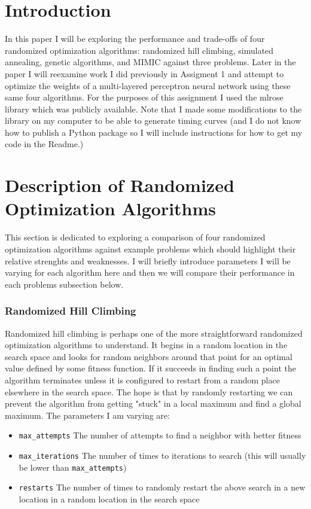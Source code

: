 \documentclass[11pt]{article}
\begin{document}
    \thispagestyle{firstpage}


    \section{Introduction}
    In this paper I will be exploring the performance and trade-offs of four randomized optimization algorithms: randomized hill climbing,
    simulated annealing, genetic algorithms, and MIMIC against three problems.
    Later in the paper I will reexamine work I did previously in Assigment 1 and attempt to optimize the weights of a multi-layered perceptron neural network
    using these same four algorithms.
    For the purposes of this assignment I used the mlrose library\cite{Hayes19} which was publicly available.
    Note that I made some modifications to the library on my computer to be able to generate timing curves (and I do not
    know how to publish a Python package so I will include instructions for how to get my code in the Readme.)


    \section{Description of Randomized Optimization Algorithms}\label{sec:description-of-randomized-optimization-algorithms}
    This section is dedicated to exploring a comparison of four randomized optimization algorithms against example problems
    which should highlight their relative strenghts and weaknesses.
    I will briefly introduce parameters I will be varying for each algorithm here and then we will compare their performance
    in each problems subsection below.
    \subsubsection*{Randomized Hill Climbing}
    Randomized hill climbing is perhaps one of the more straightforward randomized optimization algorithms to understand.
    It begins in a random location in the search space and looks for random neighbors around that point for an optimal value defined
    by some fitness function.
    If it succeeds in finding such a point the algorithm terminates unless it is configured to restart from a random place elsewhere in the search space.
    The hope is that by randomly restarting we can prevent the algorithm from getting "stuck" in a local maximum and find a global maximum.
    The parameters I am varying are:
    \begin{itemize}
        \item \texttt{max\_attempts} The number of attempts to find a neighbor with better fitness
        \item \texttt{max\_iterations} The number of times to iterations to search (this will usually be lower than \texttt{max\_attempts})
        \item \texttt{restarts} The number of times to randomly restart the above search in a new location in a random location in the search space
    \end{itemize}
\end{document}
